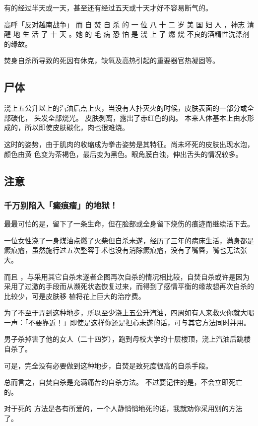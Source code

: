 \documentclass[UTF8]{ctexart}
\begin{document}
有的经过半天或一天，甚至还有经过五天或十天才好不容易断气的。

高呼「反对越南战争」 而 自 焚 自 杀 的 一 位 八 十 二 岁 美 国 妇 人 ，神志 清 醒 地 生 活 了 十 天 。她 的 毛 病 恐 怕 是 浇 上 了 燃 烧 不良的酒精性洗涤剂的缘故。 

焚身自杀所导致的死因有休克，缺氧及高热引起的重要器官热凝固等。


\subsection{尸体}

浇上五公升以上的汽油后点上火，当没有人扑灭火的时候，皮肤表面的一部分或全部碳化，
头发全部烧光。
皮肤剥离，露出了赤红色的肉。
本来人体基本上由水形成的，所以即使皮肤碳化，肉也很难烧。

这时的姿势，由于肌肉的收缩成为拳击姿势是其特征。尚未坏死的皮肤出现水泡，颜色由黄
色变为茶褐色，最后变为黑色。眼角膜白浊，伸出舌头的情况较多。


\subsection{注意}

\subsubsection*{千万别陷入「癜痕瘤」的地狱！}

最最可怕的是，留下了一条生命，但在脸部或全身留下烧伤的痕迹而继续活下去。

一位女性浇了一身煤油点燃了火柴但自杀未遂，经历了三年的病床生活，满身都是癜痕瘤，虽然施行过五次整容手术也没有消除癜痕瘤，没有了嘴唇，嘴也无法张大。

而且 ，与采用其它自杀未遂者企图再次自杀的情况相比较，自焚自杀或许是因为采用了过激的手段而从濒死状态恢复过来，而得到了感情平衡的缘故想再次自杀的比较少，可是皮肤移 植将花上巨大的治疗费。

为了不至于弄到这种地步，所以至少浇上五公升汽油，四周如有人来救火你就大喝一声：「不要靠近！」即使是这样你还是担心未遂的话，可与其它方法同时并用。

男子杀掉害了他的女人（二十四岁），跑到母校大学的十层楼顶，浇上汽油后跳楼自杀了。

可是，完全没有必要做到这种地步，自焚是致死度很高的自杀手段。

总而言之，自焚自杀是充满痛苦的自杀方法。
不过要记住的是，不会立即死亡的。

对于死的 方法是各有所爱的，一个人静悄悄地死的话，我就劝你采用别的方法了。
\end{document}
